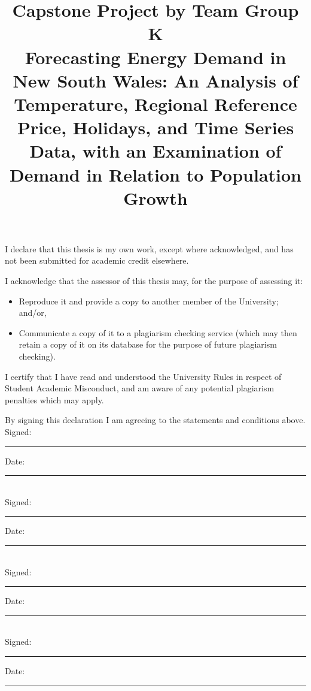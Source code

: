 \documentclass[mstat,12pt]{unswthesis}
\title{Capstone Project by Team Group K\\[0.5cm]Forecasting Energy
Demand in New South Wales: An Analysis of Temperature, Regional
Reference Price, Holidays, and Time Series Data, with an Examination of
Demand in Relation to Population Growth}
\author{\Authornameonly}
\begin{document}
\beforepreface




\vskip 2pc \noindent I declare that this thesis is my
own work, except where acknowledged, and has not been submitted for
academic credit elsewhere. 

\vskip 2pc  \noindent I acknowledge that the assessor of this
thesis may, for the purpose of assessing it:
\begin{itemize}
\item Reproduce it and provide a copy to another member of the University; and/or,
\item Communicate a copy of it to a plagiarism checking service (which may then retain a copy of it on its database for the purpose of future plagiarism checking).
\end{itemize}

\vskip 2pc \noindent I certify that I have read and understood the University Rules in
respect of Student Academic Misconduct, and am aware of any potential plagiarism penalties which may 
apply.\vspace{24pt}

\vskip 2pc \noindent By signing 
this declaration I am
agreeing to the statements and conditions above.
\vskip 2pc \noindent
Signed: \rule{7cm}{0.25pt} \hfill Date: \rule{4cm}{0.25pt} \\[1cm]
Signed: \rule{7cm}{0.25pt} \hfill Date: \rule{4cm}{0.25pt} \\[1cm]
Signed: \rule{7cm}{0.25pt} \hfill Date: \rule{4cm}{0.25pt} \\[1cm]
Signed: \rule{7cm}{0.25pt} \hfill Date: \rule{4cm}{0.25pt} \\[1cm]
\vskip 1pc




\end{document}

